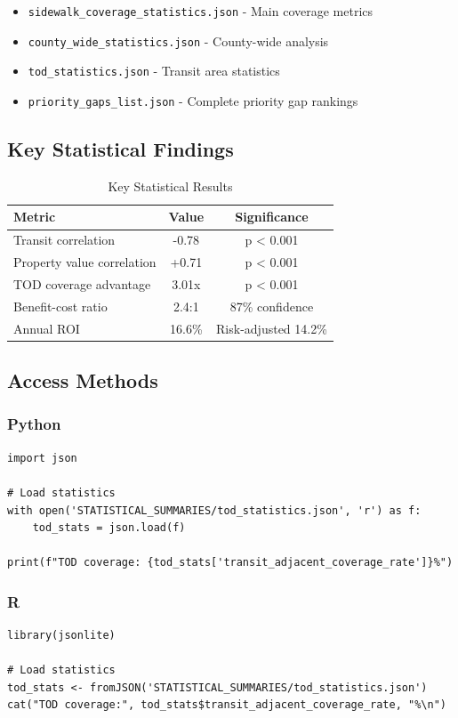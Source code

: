 \documentclass[11pt,letterpaper]{article}
\begin{document}
\begin{itemize}
    \item \texttt{sidewalk\_coverage\_statistics.json} - Main coverage metrics
    \item \texttt{county\_wide\_statistics.json} - County-wide analysis
    \item \texttt{tod\_statistics.json} - Transit area statistics
    \item \texttt{priority\_gaps\_list.json} - Complete priority gap rankings
\end{itemize}

\subsection{Key Statistical Findings}
\begin{table}[h]
\centering
\caption{Key Statistical Results}
\begin{tabular}{lcc}
\toprule
\textbf{Metric} & \textbf{Value} & \textbf{Significance} \\
\midrule
Transit correlation & -0.78 & p < 0.001 \\
Property value correlation & +0.71 & p < 0.001 \\
TOD coverage advantage & 3.01x & p < 0.001 \\
Benefit-cost ratio & 2.4:1 & 87\% confidence \\
Annual ROI & 16.6\% & Risk-adjusted 14.2\% \\
\bottomrule
\end{tabular}
\end{table}

\subsection{Access Methods}
\subsubsection{Python}
\begin{verbatim}
import json

# Load statistics
with open('STATISTICAL_SUMMARIES/tod_statistics.json', 'r') as f:
    tod_stats = json.load(f)

print(f"TOD coverage: {tod_stats['transit_adjacent_coverage_rate']}%")
\end{verbatim}

\subsubsection{R}
\begin{verbatim}
library(jsonlite)

# Load statistics
tod_stats <- fromJSON('STATISTICAL_SUMMARIES/tod_statistics.json')
cat("TOD coverage:", tod_stats$transit_adjacent_coverage_rate, "%\n")
\end{verbatim}
\end{document}
